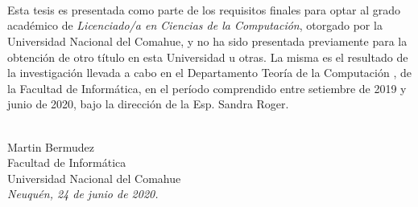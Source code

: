 \ \\
\ \\
\label{pagpref}
\\
\ \\
\ \\

\ \\

\ \\
\ \\


Esta tesis es presentada como parte de los requisitos finales para optar al grado acad\'emico de 
{\em Licenciado/a en Ciencias de la Computación}, 
otorgado por la Universidad Nacional del Comahue, y no ha sido presentada previamente para la 
obtención de otro título en esta Universidad u otras. La misma es el resultado de la investigación 
llevada a cabo en el Departamento Teoría de la Computación%
, de la Facultad de Informática, en el período comprendido entre setiembre de
2019 y junio de 2020, bajo la dirección de la Esp. Sandra Roger.%




\vspace{3cm}


\ \\
{\flushright Martin Bermudez\\
{\sc Facultad de Informática \\
Universidad Nacional del Comahue}\\
{\em Neuqu\'en, 24 de junio de 2020.}\\}

\vfill

